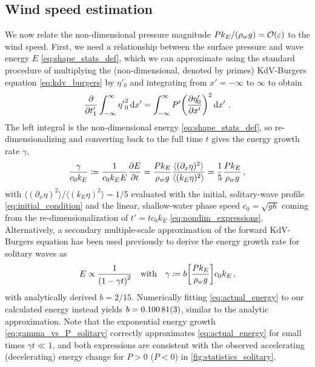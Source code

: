 \documentclass{jfm}
\renewcommand*{\epsilon}{\varepsilon}
\begin{document}
\subsection{\label{sec:press_mag} Wind speed estimation}
We now relate the non-dimensional pressure magnitude $P k_E/(\rho_w g) =
\order{\epsilon}$ to the wind speed.
First, we need a relationship between the surface pressure and wave
energy $E$ \cref{eq:shape_stats_def}, which we can approximate using the
standard procedure \citep[\eg][]{mei2005nonlinear} of multiplying the
(non-dimensional, denoted by primes) KdV-Burgers equation
\cref{eq:kdv_burgers} by $\eta'_0$ and integrating from $x'=-\infty$ to
$\infty$ to obtain
\begin{equation}
  \pdv{t'_1} \int_{-\infty}^{\infty} {\eta'}_0^2 \dd{x'}
  = \int_{-\infty}^{\infty} P' \pqty{\pdv{\eta'_0}{x'}}^2
  \dd{x'} \,.
  \label{eq:energy_nondim}
\end{equation}
The left integral is the non-dimensional energy
\cref{eq:shape_stats_def}, so re-dimensionalizing and converting back to
the full time $t$ gives the energy growth rate $\gamma$,
\begin{equation}
  \frac{\gamma}{c_0 k_E} \coloneqq
  \frac{1}{c_0 k_E E} \pdv{E}{t}
  = \frac{P k_E}{\rho_w g} \frac{\langle (\partial_x \eta)^2 \rangle}
    {\langle (k_E \eta)^2 \rangle}
  = \frac{1}{5} \frac{P k_E}{\rho_w g}
  \,,
  \label{eq:gamma_vs_P_solitary}
\end{equation}
with $\langle (\partial_x \eta)^2 \rangle / \langle (k_E \eta)^2 \rangle
= 1/5$ evaluated with the initial, solitary-wave profile
\cref{eq:initial_condition} and the linear, shallow-water phase speed
$c_0 = \sqrt{gh}$ coming from the re-dimensionalization of $t' = t c_0
k_E$ \cref{eq:nondim_expressions}.
Alternatively, a secondary multiple-scale approximation of the
forward KdV-Burgers equation has been used previously to derive
the energy growth rate for solitary waves as~\citep{zdyrski2019effects}
\begin{equation}
  E \propto \frac{1}{\pqty{1 - \gamma t}^2}
  \qq{with}
  \gamma \coloneqq b \bqty{\frac{P k_E}{\rho_w g}} c_0 k_E
  \,,
  \label{eq:actual_energy}
\end{equation}
with analytically derived $b = 2/15$.
Numerically fitting \cref{eq:actual_energy} to our calculated energy
instead yields $b = \num{0.10081 \pm 0.00003}$, similar to the analytic
approximation.
Note that the exponential energy growth \cref{eq:gamma_vs_P_solitary}
correctly approximates \cref{eq:actual_energy} for small times $\gamma t
\ll 1$, and both expressions are consistent with the observed
accelerating (decelerating) energy change for $P>0$ ($P<0$) in
\cref{fig:statistics_solitary}.
\end{document}
